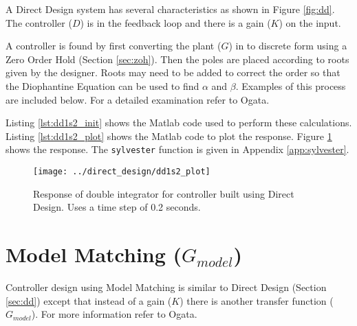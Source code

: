 \documentclass{article}
\newcommand{\sincludepdf}[2][]{
	
}
\begin{document}
A Direct Design system has several characteristics as shown
in Figure \ref{fig:dd}.
The controller ($D$) is in the feedback loop and there is a gain ($K$)
on the input.

A controller is found by first converting the plant ($G$) in to discrete form
using a Zero Order Hold (Section \ref{sec:zoh}).
Then the poles are placed according to roots given by the designer.
Roots may need to be added to correct the order so that the Diophantine
Equation can be used to find $\alpha$ and $\beta$.
Examples of this process are included below.
For a detailed examination refer to Ogata\autocite[Pg. 517]{ogata1995discrete}.

\sincludepdf[pages=1,
			pagecommand=\subsection*{Example: $\dfrac{1}{s^2}$}
	]{scan/11211302.pdf}
\sincludepdf[pages=2-5]{scan/11211302.pdf}

Listing \ref{lst:dd1s2_init} shows the Matlab code used to perform
these calculations.
Listing \ref{lst:dd1s2_plot} shows the Matlab code to plot the response.
Figure \ref{fig:dd1s2_plot} shows the response.
The \verb+sylvester+ function is given in Appendix \ref{app:sylvester}.





\begin{figure}
\begin{center}
\texttt{[image: ../direct\_design/dd1s2\_plot]}
\end{center}
\caption{Response of double integrator for controller built
using Direct Design. Uses a time step of 0.2 seconds.}
\label{fig:dd1s2_plot}
\end{figure}


\clearpage
\section{Model Matching ($G_{model}$)}
\label{sec:mm}

Controller design using Model Matching is similar to Direct Design
(Section \ref{sec:dd}) except that instead of a gain ($K$) there is
another transfer function ($G_{model}$).
For more information refer to Ogata\autocite[Pg. 532]{ogata1995discrete}.
\end{document}
